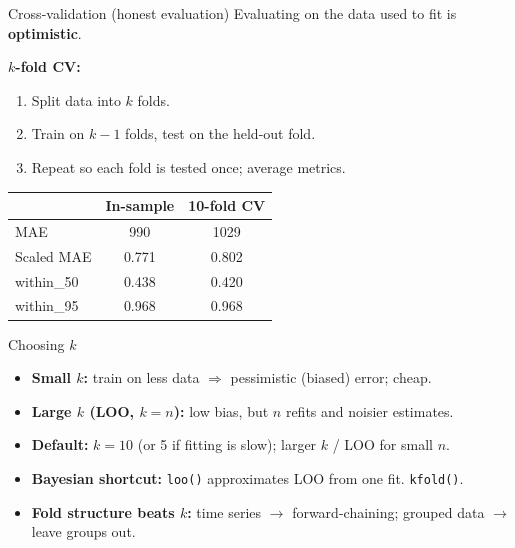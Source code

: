 \documentclass[aspectratio=43,11pt]{beamer}
\begin{document}
\begin{frame}{Cross-validation (honest evaluation)}
  Evaluating on the data used to fit is \textbf{optimistic}.
  \vspace{0.4em}

  \textbf{$k$-fold CV:}
  \begin{enumerate}
    \item Split data into $k$ folds.
    \item Train on $k-1$ folds, test on the held-out fold.
    \item Repeat so each fold is tested once; average metrics.
  \end{enumerate}
  \vspace{0.4em}
  \centering
  \begin{tabular}{@{}lcc@{}}
    \toprule
    & In-sample & 10-fold CV \\
    \midrule
    MAE & 990 & 1029 \\
    Scaled MAE & 0.771 & 0.802 \\
    within\_50 & 0.438 & 0.420 \\
    within\_95 & 0.968 & 0.968 \\
    \bottomrule
  \end{tabular}
\end{frame}

{
\begin{frame}{Choosing $k$}
  \begin{itemize}
    \item \textbf{Small $k$:} train on less data $\Rightarrow$ pessimistic
      (biased) error; cheap.
    \item \textbf{Large $k$ (LOO, $k=n$):} low bias, but $n$ refits and
      noisier estimates.
    \item \textbf{Default:} $k = 10$ (or 5 if fitting is slow);
      larger $k$ / LOO for small $n$.
    \item \textbf{Bayesian shortcut:} \texttt{loo()} approximates
      LOO from one fit. %
      \texttt{kfold()}.
    \item \textbf{Fold structure beats $k$:} time series $\to$
      forward-chaining; grouped data $\to$ leave groups out.
  \end{itemize}
\end{frame}
}
\end{document}
